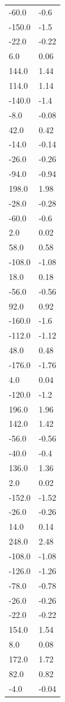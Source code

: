 \begin{longtable}{ll}
-60.0 & -0.6 \\
-150.0 & -1.5 \\
-22.0 & -0.22 \\
6.0 & 0.06 \\
144.0 & 1.44 \\
114.0 & 1.14 \\
-140.0 & -1.4 \\
-8.0 & -0.08 \\
42.0 & 0.42 \\
-14.0 & -0.14 \\
-26.0 & -0.26 \\
-94.0 & -0.94 \\
198.0 & 1.98 \\
-28.0 & -0.28 \\
-60.0 & -0.6 \\
2.0 & 0.02 \\
58.0 & 0.58 \\
-108.0 & -1.08 \\
18.0 & 0.18 \\
-56.0 & -0.56 \\
92.0 & 0.92 \\
-160.0 & -1.6 \\
-112.0 & -1.12 \\
48.0 & 0.48 \\
-176.0 & -1.76 \\
4.0 & 0.04 \\
-120.0 & -1.2 \\
196.0 & 1.96 \\
142.0 & 1.42 \\
-56.0 & -0.56 \\
-40.0 & -0.4 \\
136.0 & 1.36 \\
2.0 & 0.02 \\
-152.0 & -1.52 \\
-26.0 & -0.26 \\
14.0 & 0.14 \\
248.0 & 2.48 \\
-108.0 & -1.08 \\
-126.0 & -1.26 \\
-78.0 & -0.78 \\
-26.0 & -0.26 \\
-22.0 & -0.22 \\
154.0 & 1.54 \\
8.0 & 0.08 \\
172.0 & 1.72 \\
82.0 & 0.82 \\
-4.0 & -0.04 \\

\end{longtable}
